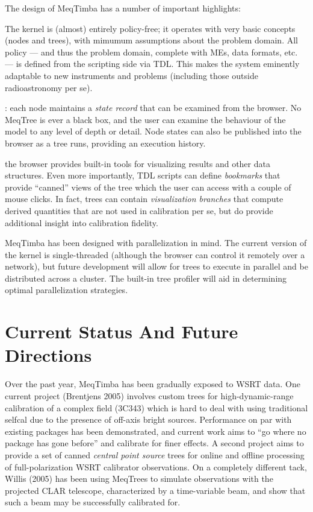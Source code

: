 \documentclass[11pt,twoside]{article}  %
\begin{document}
\noindent The design of MeqTimba has a number of important highlights:

 The kernel is (almost) entirely policy-free; it
operates with very basic concepts (nodes and trees), with mimumum assumptions
about the problem domain. All policy --- and thus the problem domain, complete
with MEs, data formats, etc. --- is defined from the scripting side via TDL.
This makes the system eminently adaptable to new instruments and problems
(including those outside radioastronomy per se). 

: each node maintains a {\em state record} that
can be examined from the browser. No MeqTree is ever a black box, and the user
can examine the behaviour of the model to any level of depth or detail.
Node states can also be published into the browser as a tree runs, providing an
execution history. 

 the browser provides built-in tools for
visualizing results and other data structures. Even more importantly, TDL
scripts can define {\em bookmarks} that provide ``canned'' views of the tree
which the user can access with a couple of mouse clicks. In fact, trees can
contain {\em visualization branches} that compute derived quantities that are
not used in calibration per se, but do provide additional insight into
calibration fidelity. 

 MeqTimba has been designed with
parallelization in mind. The current version of the kernel is single-threaded
(although the browser can control it remotely over a network), but future
development will allow for trees to execute in parallel and be distributed
across a cluster. The built-in tree profiler will aid in determining optimal
parallelization strategies.

\section{Current Status And Future Directions}

Over the past year, MeqTimba has been gradually exposed to WSRT data. One
current project (Brentjens 2005) involves custom trees for high-dynamic-range
calibration of a complex field (3C343) which is hard to deal with using
traditional selfcal due to the presence of off-axis bright sources. Performance
on par with existing packages has been demonstrated, and current work aims to
``go where no package has gone before'' and calibrate for finer effects. A
second project aims to provide a set of canned {\em central point source} trees
for online and offline processing of full-polarization WSRT calibrator
observations. On a completely different tack, Willis (2005) has been using
MeqTrees to simulate observations with the projected CLAR telescope,
characterized by a time-variable beam, and show that such a beam may be
successfully calibrated for.
\end{document}
